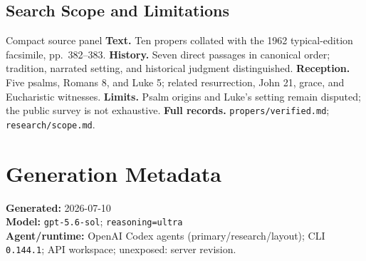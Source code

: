 \begin{deepstudy}
\subsection*{Search Scope and Limitations}

\begin{studybox}{Compact source panel}
\textbf{Text.} Ten propers collated with the 1962 typical-edition facsimile, pp.~382--383. \textbf{History.} Seven direct passages in canonical order; tradition, narrated setting, and historical judgment distinguished. \textbf{Reception.} Five psalms, Romans 8, and Luke 5; related resurrection, John 21, grace, and Eucharistic witnesses. \textbf{Limits.} Psalm origins and Luke's setting remain disputed; the public survey is not exhaustive. \textbf{Full records.} \nolinkurl{propers/verified.md}; \nolinkurl{research/scope.md}.
\end{studybox}

\section*{Generation Metadata}

{\footnotesize
\textbf{Generated:} 2026-07-10\\
\textbf{Model:} \texttt{gpt-5.6-sol}; \texttt{reasoning=ultra}\\
\textbf{Agent/runtime:} OpenAI Codex agents (primary/research/layout); CLI \texttt{0.144.1}; API workspace; unexposed: server revision.\par
}

\end{deepstudy}

